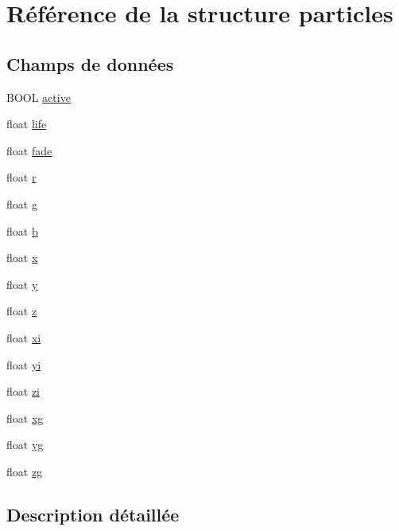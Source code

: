 \hypertarget{structparticles}{}\section{Référence de la structure particles}
\label{structparticles}
\subsection*{Champs de données}
\begin{DoxyCompactItemize}
\item 
B\+O\+O\+L \hyperlink{structparticles_a22389371583c4b8843e06da43399d6d9}{active}
\item 
float \hyperlink{structparticles_a6283673946355f360ce6a174f919a942}{life}
\item 
float \hyperlink{structparticles_a4a67cfd76d94f75c28419fe71aeb684f}{fade}
\item 
float \hyperlink{structparticles_a4788d82c901b9367dd5c0daff8a7616b}{r}
\item 
float \hyperlink{structparticles_a8cf17d727651616de6f2b79ef32170cd}{g}
\item 
float \hyperlink{structparticles_a83fc1af92e29717b4513d121b0c72c7d}{b}
\item 
float \hyperlink{structparticles_ad0da36b2558901e21e7a30f6c227a45e}{x}
\item 
float \hyperlink{structparticles_aa4f0d3eebc3c443f9be81bf48561a217}{y}
\item 
float \hyperlink{structparticles_af73583b1e980b0aa03f9884812e9fd4d}{z}
\item 
float \hyperlink{structparticles_a39291e1e7c5545a7b8a9c64b89d973f9}{xi}
\item 
float \hyperlink{structparticles_a2700b8bdea86358af21700a5694ed3a9}{yi}
\item 
float \hyperlink{structparticles_a0f8e8eceb70ae73da2c1ecf3a2ac6cc1}{zi}
\item 
float \hyperlink{structparticles_a1b0cf5d5798f0b2062544358ca46ffd1}{xg}
\item 
float \hyperlink{structparticles_ab51c8c36335423b174b120c9717fbd7f}{yg}
\item 
float \hyperlink{structparticles_a7eba9960b5039b751f3df38af74fd9c5}{zg}
\end{DoxyCompactItemize}


\subsection{Description détaillée}


